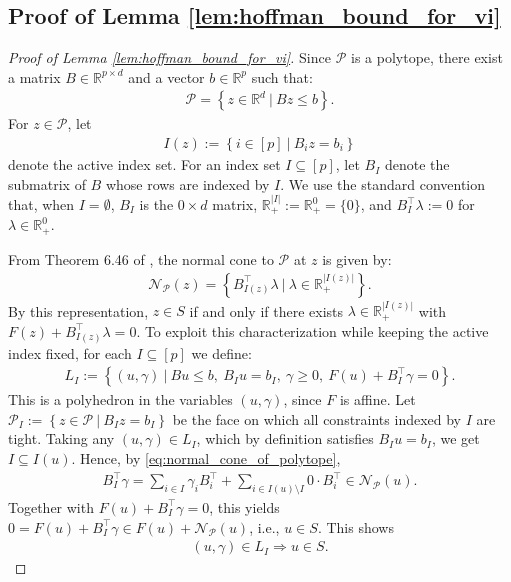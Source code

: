 \documentclass{article}
\newcommand{\R}{\mathbb{R}}
\theoremstyle{plain}
\begin{document}
\subsection{Proof of Lemma \ref{lem:hoffman_bound_for_vi}}
\begin{proof}[Proof of Lemma \ref{lem:hoffman_bound_for_vi}]
    Since $\mathcal{P}$ is a polytope, there exist a matrix $B\in \R^{p\times d}$ and a vector $b\in \R^p$ such that:
    \begin{align*}
        \mathcal{P} = \left\{z\in \R^d ~|~ Bz \leq b\right\}.
    \end{align*}
    For $z\in \mathcal{P}$, let
    \begin{align*}
        I(z) := \left\{i\in [p] ~|~ B_i z = b_i\right\}
    \end{align*}
    denote the active index set.
    For an index set $I\subseteq [p]$, let $B_I$ denote the submatrix of $B$ whose rows are indexed by $I$.
    We use the standard convention that, when $I = \emptyset$, $B_I$ is the $0\times d$ matrix, $\R^{|I|}_+ := \R^0_+ = \{0\}$, and $B_I^{\top}\lambda := 0$ for $\lambda\in \R^0_+$.

    From Theorem 6.46 of \citet{rockafellar2009variational}, the normal cone to $\mathcal{P}$ at $z$ is given by:
    \begin{align}
        \mathcal{N}_{\mathcal{P}}(z) = \left\{B_{I(z)}^{\top}\lambda ~|~ \lambda\in \R^{|I(z)|}_+\right\}.
        \label{eq:normal_cone_of_polytope}
    \end{align}
    By this representation, $z\in S$ if and only if there exists $\lambda\in \R^{|I(z)|}_+$ with $F(z) + B_{I(z)}^{\top}\lambda = 0$.
    To exploit this characterization while keeping the active index fixed, for each $I\subseteq [p]$ we define:
    \begin{align*}
        L_I := \left\{(u, \gamma) ~|~ Bu\leq b, ~B_I u = b_I, ~\gamma\geq 0, ~F(u) + B_I^{\top}\gamma = 0\right\}.
    \end{align*}
    This is a polyhedron in the variables $(u, \gamma)$, since $F$ is affine.
    Let $\mathcal{P}_I := \left\{z\in \mathcal{P} ~|~ B_I z = b_I\right\}$ be the face on which all constraints indexed by $I$ are tight.
    Taking any $(u, \gamma)\in L_I$, which by definition satisfies $B_I u = b_I$, we get $I\subseteq I(u)$.
    Hence, by \eqref{eq:normal_cone_of_polytope},
    \begin{align*}
        B_I^{\top}\gamma = \sum_{i\in I}\gamma_i B_i^{\top} + \sum_{i\in I(u)\setminus I} 0 \cdot B_i^{\top} \in \mathcal{N}_{\mathcal{P}}(u).
    \end{align*}
    Together with $F(u) + B_I^{\top}\gamma = 0$, this yields $0 = F(u) + B_I^{\top}\gamma \in F(u) + \mathcal{N}_{\mathcal{P}}(u)$, i.e., $u\in S$.
    This shows
    \begin{align}
        (u, \gamma)\in L_I \Rightarrow u\in S.
        \label{eq:L_I_implies_S}
    \end{align}


\end{proof}
\end{document}

